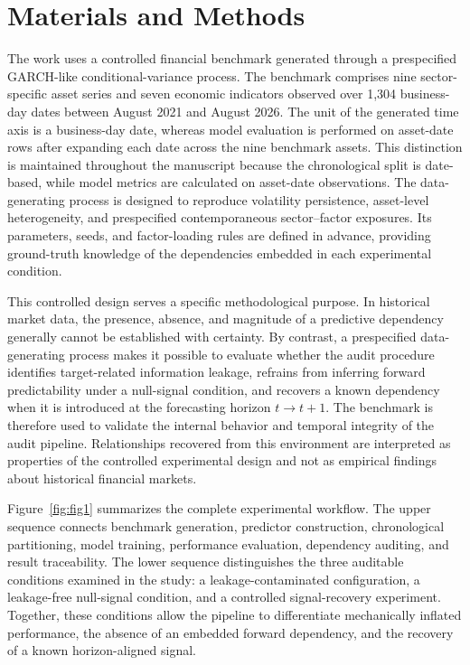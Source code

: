 \documentclass[utf8]{FrontiersinHarvard} %
\newcommand{\rev}[1]{{\color{red}#1}}
\begin{document}
\section{Materials and Methods}
\label{sec:Methods}

The work uses a controlled financial benchmark generated through a prespecified GARCH-like conditional-variance process. The benchmark comprises nine sector-specific asset series and seven economic indicators observed over 1,304 business-day dates between August 2021 and August 2026. \rev{The unit of the generated time axis is a business-day date, whereas model evaluation is performed on asset-date rows after expanding each date across the nine benchmark assets. This distinction is maintained throughout the manuscript because the chronological split is date-based, while model metrics are calculated on asset-date observations.} The data-generating process is designed to reproduce volatility persistence, asset-level heterogeneity, and prespecified contemporaneous sector--factor exposures. Its parameters, seeds, and factor-loading rules are defined in advance, providing ground-truth knowledge of the dependencies embedded in each experimental condition.

This controlled design serves a specific methodological purpose. In historical market data, the presence, absence, and magnitude of a predictive dependency generally cannot be established with certainty. By contrast, a prespecified data-generating process makes it possible to evaluate whether the audit procedure identifies target-related information leakage, refrains from inferring forward predictability under a null-signal condition, and recovers a known dependency when it is introduced at the forecasting horizon \(t \rightarrow t+1\). The benchmark is therefore used to validate the internal behavior and temporal integrity of the audit pipeline. Relationships recovered from this environment are interpreted as properties of the controlled experimental design and not as empirical findings about historical financial markets.

Figure~\ref{fig:fig1} summarizes the complete experimental workflow. The upper sequence connects benchmark generation, predictor construction, chronological partitioning, model training, performance evaluation, dependency auditing, and result traceability. The lower sequence distinguishes the three auditable conditions examined in the study: a leakage-contaminated configuration, a leakage-free null-signal condition, and a controlled signal-recovery experiment. Together, these conditions allow the pipeline to differentiate mechanically inflated performance, the absence of an embedded forward dependency, and the recovery of a known horizon-aligned signal.
\end{document}
